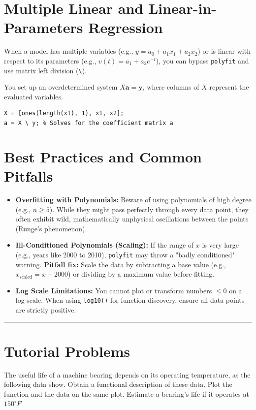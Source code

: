 \section{Multiple Linear and Linear-in-Parameters Regression}
When a model has multiple variables (e.g., $y = a_0 + a_1x_1 + a_2x_2$) or is linear with respect to its parameters (e.g., $v(t) = a_1 + a_2e^{-t}$), you can bypass \texttt{polyfit} and use matrix left division (\texttt{\textbackslash}).

You set up an overdetermined system $X\mathbf{a} = \mathbf{y}$, where columns of $X$ represent the evaluated variables.
\begin{lstlisting}
X = [ones(length(x1), 1), x1, x2];
a = X \ y; % Solves for the coefficient matrix a
\end{lstlisting}

\section{Best Practices and Common Pitfalls}
\begin{itemize}
    \item \textbf{Overfitting with Polynomials:} Beware of using polynomials of high degree (e.g., $n \ge 5$). While they might pass perfectly through every data point, they often exhibit wild, mathematically unphysical oscillations between the points (Runge's phenomenon).
    \item \textbf{Ill-Conditioned Polynomials (Scaling):} If the range of $x$ is very large (e.g., years like 2000 to 2010), \texttt{polyfit} may throw a "badly conditioned" warning. \textbf{Pitfall fix:} Scale the data by subtracting a base value (e.g., $x_{\text{scaled}} = x - 2000$) or dividing by a maximum value before fitting.
    \item \textbf{Log Scale Limitations:} You cannot plot or transform numbers $\le 0$ on a log scale. When using \texttt{log10()} for function discovery, ensure all data points are strictly positive.
\end{itemize}

\vspace{0.5cm}
\hrule

\section*{Tutorial Problems}

The useful life of a machine bearing depends on its operating temperature, as the following data show. Obtain a functional description of these data. Plot the function and the data on the same plot. Estimate a bearing's life if it operates at $150^\circ F$


